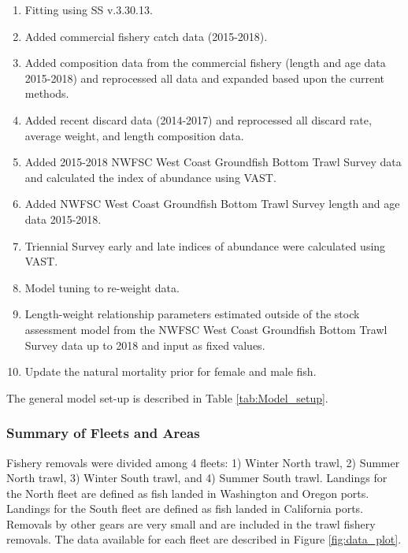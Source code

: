 \documentclass[12pt,]{article}
\begin{document}
\begin{enumerate}

\item Fitting using SS v.3.30.13.

\item Added commercial fishery catch data (2015-2018).

\item Added composition data from the commercial fishery (length and age data 2015-2018) and reprocessed all data and expanded based upon the current methods.

\item Added recent discard data (2014-2017) and reprocessed all discard rate, average weight, and length composition data.

\item Added 2015-2018 NWFSC West Coast Groundfish Bottom Trawl Survey  data and calculated the index of abundance using VAST.

\item Added NWFSC West Coast Groundfish Bottom Trawl Survey length and age data 2015-2018.

\item Triennial Survey early and late indices of abundance were calculated using VAST.

\item Model tuning to re-weight data. 

\item Length-weight relationship parameters estimated outside of the stock assessment model from the NWFSC West Coast Groundfish Bottom Trawl Survey data up to 2018 and input as fixed values.

\item Update the natural mortality prior for female and male fish.

\end{enumerate}

The general model set-up is described in Table \ref{tab:Model_setup}.

\subsubsection{Summary of Fleets and
Areas}\label{summary-of-fleets-and-areas}

Fishery removals were divided among 4 fleets: 1) Winter North trawl, 2)
Summer North trawl, 3) Winter South trawl, and 4) Summer South trawl.
Landings for the North fleet are defined as fish landed in Washington
and Oregon ports. Landings for the South fleet are defined as fish
landed in California ports. Removals by other gears are very small and
are included in the trawl fishery removals. The data available for each
fleet are described in Figure \ref{fig:data_plot}.
\end{document}
